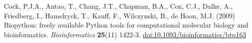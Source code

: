 \documentclass[10pt,oneside]{article}
\begin{document}
\begin{thebibliography}{}

Cock, P.J.A., Antao, T., Chang, J.T., Chapman, B.A., Cox, C.J., Dalke, A., Friedberg, I., Hamelryck, T., Kauff, F., Wilczynski, B., de Hoon, M.J. (2009) Biopython: freely available Python tools for computational molecular biology and bioinformatics. {\it Bioinformatics} {\bf 25}(11) 1422-3. \href{http://dx.doi.org/10.1093/bioinformatics/btp163}{doi:10.1093/bioinformatics/btp163}

\end{thebibliography}
\end{document}
